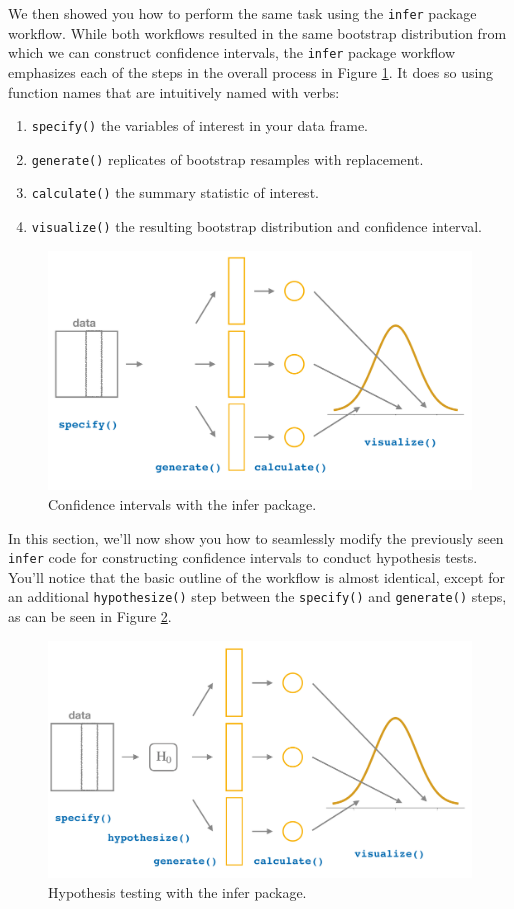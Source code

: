 \documentclass[
]{book}
\providecommand{\tightlist}{%
  \setlength{\itemsep}{0pt}\setlength{\parskip}{0pt}}
\begin{document}
We then showed you how to perform the same task using the \texttt{infer} package workflow. While both workflows resulted in the same bootstrap distribution from which we can construct confidence intervals, the \texttt{infer} package workflow emphasizes each of the steps in the overall process in Figure \ref{fig:infer-ci}. It does so using function names that are intuitively named with verbs:

\begin{enumerate}
\def\labelenumi{\arabic{enumi}.}
\tightlist
\item
  \texttt{specify()} the variables of interest in your data frame.
\item
  \texttt{generate()} replicates of bootstrap resamples with replacement.
\item
  \texttt{calculate()} the summary statistic of interest.
\item
  \texttt{visualize()} the resulting bootstrap distribution and confidence interval.
\end{enumerate}

\begin{figure}
\includegraphics[width=0.8\linewidth]{images/flowcharts/infer/visualize} \caption{Confidence intervals with the infer package.}\label{fig:infer-ci}
\end{figure}

In this section, we'll now show you how to seamlessly modify the previously seen \texttt{infer} code for constructing confidence intervals to conduct hypothesis tests. You'll notice that the basic outline of the workflow is almost identical, except for an additional \texttt{hypothesize()} step between the \texttt{specify()} and \texttt{generate()} steps, as can be seen in Figure \ref{fig:inferht}.

\begin{figure}
\includegraphics[width=0.8\linewidth]{images/flowcharts/infer/ht} \caption{Hypothesis testing with the infer package.}\label{fig:inferht}
\end{figure}
\end{document}
